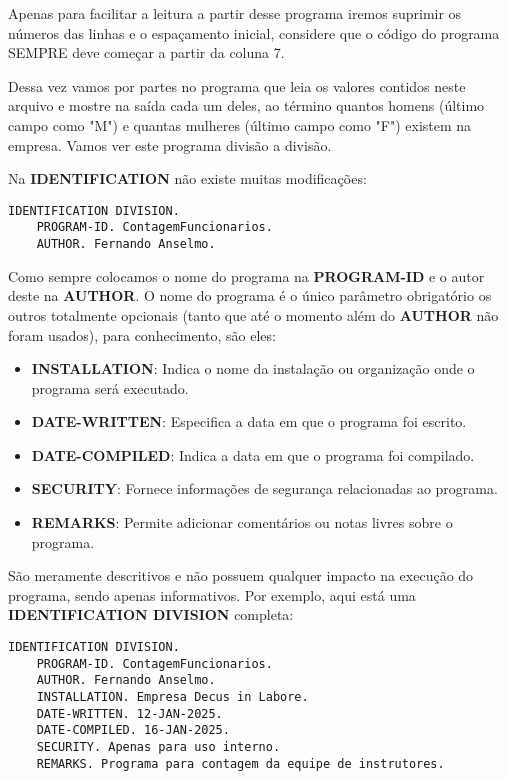 \begin{note}
	Apenas para facilitar a leitura a partir desse programa iremos suprimir os números das linhas e o espaçamento inicial, considere que o código do programa SEMPRE deve começar a partir da coluna 7.
\end{note}

Dessa vez vamos por partes no programa que leia os valores contidos neste arquivo e mostre na saída cada um deles, ao término quantos homens (último campo como "M") e quantas mulheres (último campo como "F") existem na empresa. Vamos ver este programa divisão a divisão.

Na \textbf{IDENTIFICATION} não existe muitas modificações:
\begin{lstlisting}[]
IDENTIFICATION DIVISION.
    PROGRAM-ID. ContagemFuncionarios.
    AUTHOR. Fernando Anselmo.	
\end{lstlisting}

Como sempre colocamos o nome do programa na \textbf{PROGRAM-ID} e o autor deste na \textbf{AUTHOR}. O nome do programa é o único parâmetro obrigatório os outros totalmente opcionais (tanto que até o momento além do \textbf{AUTHOR} não foram usados), para conhecimento, são eles:
\begin{itemize}
	\item \textbf{INSTALLATION}: Indica o nome da instalação ou organização onde o programa será executado.
	\item \textbf{DATE-WRITTEN}: Especifica a data em que o programa foi escrito.
	\item \textbf{DATE-COMPILED}: Indica a data em que o programa foi compilado.
	\item \textbf{SECURITY}: Fornece informações de segurança relacionadas ao programa.
	\item \textbf{REMARKS}: Permite adicionar comentários ou notas livres sobre o programa.
\end{itemize}

São meramente descritivos e não possuem qualquer impacto na execução do programa, sendo apenas informativos. Por exemplo, aqui está uma \textbf{IDENTIFICATION DIVISION} completa:
\begin{lstlisting}[]
IDENTIFICATION DIVISION.
    PROGRAM-ID. ContagemFuncionarios.
    AUTHOR. Fernando Anselmo.
    INSTALLATION. Empresa Decus in Labore.
    DATE-WRITTEN. 12-JAN-2025.
    DATE-COMPILED. 16-JAN-2025.
    SECURITY. Apenas para uso interno.
    REMARKS. Programa para contagem da equipe de instrutores.
\end{lstlisting}

